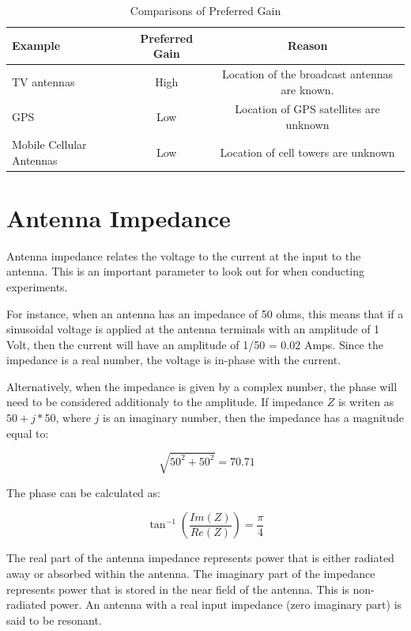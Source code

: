 \documentclass[a4paper,12pt]{report}
\begin{document}
\begin{table}[h]
  \centering
  \caption{Comparisons of Preferred Gain}
  \label{table}
  \begin{tabular}[]{lcc}
    \hline
    Example & Preferred Gain & Reason \\
    \hline\hline
    TV antennas & High & Location of the broadcast antennas are known. \\
    \hline
    GPS & Low & Location of GPS satellites are unknown \\
    \hline
    Mobile Cellular Antennas & Low & Location of cell towers are unknown \\
    \hline
  \end{tabular}
\end{table}

\section{Antenna Impedance}


Antenna impedance relates the voltage to the current at the input to the antenna.
This is an important parameter to look out for when conducting experiments.

For instance, when an antenna has an impedance of 50 ohms,
this means that if a sinusoidal voltage is applied at the antenna terminals with an amplitude of 1 Volt,
then the current will have an amplitude of 1/50 = 0.02 Amps.
Since the impedance is a real number, the voltage is in-phase with the current.

Alternatively, when the impedance is given by a complex number,
the phase will need to be considered additionaly to the amplitude.
If impedance $Z$ is writen as $50 + j*50$, where $j$ is an imaginary number,
then the impedance has a magnitude equal to:

\begin{equation}
  \sqrt[]{50^2 + 50 ^2} = 70.71
\end{equation}

The phase can be calculated as:

\begin{equation}
  \tan^{-1}(\frac{Im(Z)}{Re(Z)}) = \frac{\pi}{4}
\end{equation}

The real part of the antenna impedance represents power that is either radiated away or absorbed within the antenna.
The imaginary part of the impedance represents power
that is stored in the near field of the antenna.
This is non-radiated power.
An antenna with a real input impedance (zero imaginary part)
is said to be resonant.
\end{document}
